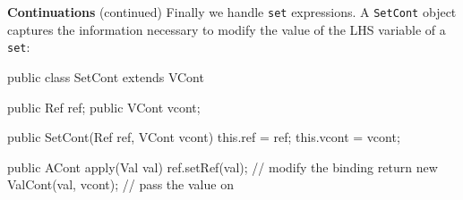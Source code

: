 \begin{minipage}[t]{\sw}
\slidenumber
\LARGE
{\bf Continuations} (continued)\exx
Finally we handle \verb'set' expressions.
A \verb'SetCont' object captures the information necessary
to modify the value of the LHS variable of a \verb'set':
\Large
\begin{qv}
public class SetCont extends VCont {

    public Ref ref;
    public VCont vcont;

    public SetCont(Ref ref, VCont vcont) {
        this.ref = ref;
        this.vcont = vcont;
    }

    public ACont apply(Val val) {
        ref.setRef(val);                // modify the binding
        return new ValCont(val, vcont); // pass the value on
    }
}
\end{qv}
\end{minipage}
